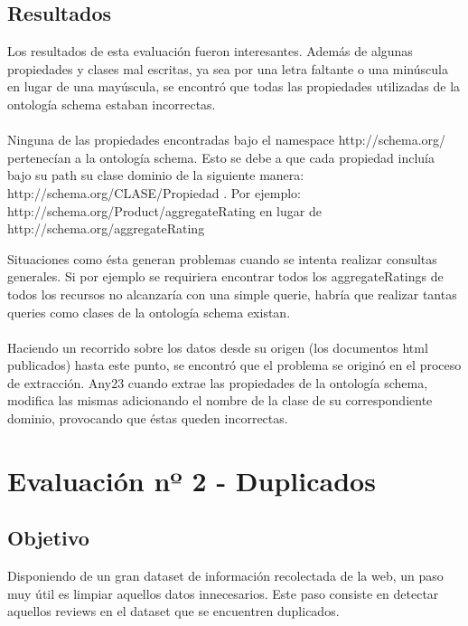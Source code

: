 \subsection*{Resultados}
Los resultados de esta evaluación fueron interesantes. Además de algunas propiedades y clases mal escritas, ya sea por una letra faltante o una minúscula en lugar 
de una mayúscula, se encontró que todas las propiedades utilizadas de la ontología schema estaban incorrectas.
\\\\
Ninguna de las propiedades encontradas bajo el namespace http://schema.org/ pertenecían a la ontología schema.
Esto se debe a que cada propiedad incluía bajo su path su clase dominio de la siguiente manera: \\\noindent http://schema.org/CLASE/Propiedad .
Por ejemplo: \\\noindent
http://schema.org/Product/aggregateRating en lugar de \\\noindent http://schema.org/aggregateRating

Situaciones como ésta generan problemas cuando se intenta realizar consultas generales. Si por ejemplo se requiriera encontrar todos los aggregateRatings de todos los recursos no alcanzaría con 
una simple querie, habría que realizar tantas queries como clases de la ontología schema existan.
\\\\
Haciendo un recorrido sobre los datos desde su origen (los documentos html publicados) hasta este punto, se encontró que el problema se 
originó en el proceso de extracción. 
Any23 cuando extrae las propiedades de la ontología schema, modifica las mismas adicionando el nombre de la clase de su correspondiente dominio, provocando que éstas queden incorrectas.

\section{Evaluación nº 2 - Duplicados}
\label{section:evaluacion-duplicados}

\subsection*{Objetivo}
Disponiendo de un gran dataset de información recolectada de la web, un paso muy útil es limpiar aquellos datos innecesarios. 
Este paso consiste en detectar aquellos reviews en el dataset que se encuentren duplicados.

